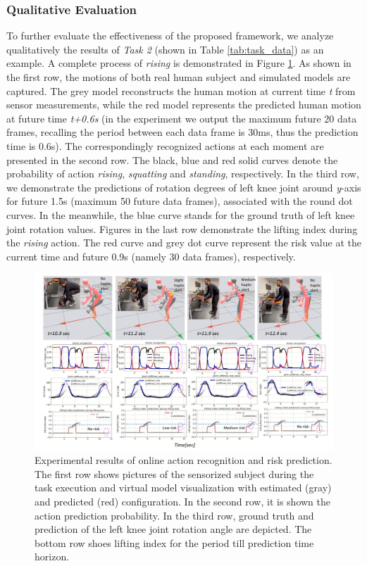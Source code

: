 \subsubsection{Qualitative Evaluation}
\label{sec: qualitative evaluation}
To further evaluate the effectiveness of the proposed framework, we analyze qualitatively the results of \emph{Task 2} (shown in Table \ref{tab:task_data}) as an example. A complete process of \emph{rising} is demonstrated in Figure \ref{fig:resutls}. As shown in the first row, the motions of both real human subject and simulated models are captured. The grey model reconstructs the human motion at current time \emph{t} from sensor measurements, while the red model represents the predicted human motion at future time \emph{t+0.6s} (in the experiment we output the maximum future 20 data frames, recalling the period between each data frame is 30ms, thus the prediction time is 0.6s). The correspondingly recognized actions at each moment are presented in the second row. The black, blue and red solid curves denote the probability of action \emph{rising}, \emph{squatting} and \emph{standing}, respectively. In the third row, we demonstrate the predictions of rotation degrees of left knee joint around \emph{y}-axis for future 1.5s (maximum 50 future data frames), associated with the round dot curves. In the meanwhile, the blue curve stands for the ground truth of left knee joint rotation values. Figures in the last row demonstrate the lifting index during the \emph{rising} action. The red curve and grey dot curve represent the risk value at the current time and future 0.9s (namely 30 data frames), respectively.
\begin{figure}[h]
    \centering
    \includegraphics[width=1.0\textwidth]{figures/modified_qualitative_plot.png}
    \caption{Experimental results of online action recognition and risk prediction. The first row shows pictures of the sensorized subject during the task execution and virtual model visualization with estimated (gray) and predicted (red) configuration. In the second row, it is shown the action prediction probability. In the third row, ground truth and prediction of the left knee joint rotation angle are depicted. The bottom row shoes lifting index for the period till prediction time horizon.}
    \label{fig:resutls}
\end{figure}

